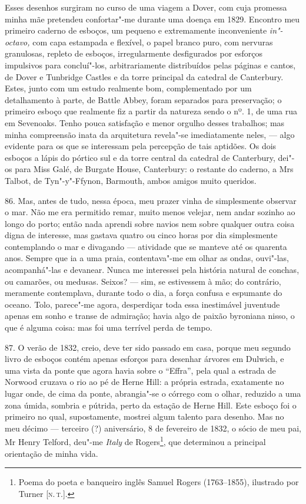 Esses desenhos surgiram no curso de uma viagem a Dover, com cuja
promessa minha mãe pretendeu confortar"-me durante uma doença em 1829.
Encontro meu primeiro caderno de esboços, um pequeno e extremamente
inconveniente \emph{in"-octavo,} com capa estampada e flexível, o papel
branco puro, com nervuras granulosas, repleto de esboços, irregularmente
desfigurados por esforços impulsivos para concluí"-los, arbitrariamente
distribuídos pelas páginas e cantos, de Dover e Tunbridge Castles e da
torre principal da catedral de Canterbury. Estes, junto com um estudo
realmente bom, complementado por um detalhamento à parte, de Battle
Abbey, foram separados para preservação; o primeiro esboço que realmente
fiz a partir da natureza sendo o nº. 1, de uma rua em Sevenoaks. Tenho
pouca satisfação e menor orgulho desses trabalhos; mas minha compreensão
inata da arquitetura revela"-se imediatamente neles, --- algo evidente
para os que se interessam pela percepção de tais aptidões. Os dois
esboços a lápis do pórtico sul e da torre central da catedral de
Canterbury, dei"-os para Miss Galé, de Burgate House, Canterbury: o
restante do caderno, a Mrs Talbot, de Tyn"-y"-Ffynon, Barmouth, ambos
amigos muito queridos.

86. Mas, antes de tudo, nessa época, meu prazer vinha de simplesmente
observar o mar. Não me era permitido remar, muito menos velejar, nem
andar sozinho ao longo do porto; então nada aprendi sobre navios nem
sobre qualquer outra coisa digna de interesse, mas gastava quatro ou
cinco horas por dia simplesmente contemplando o mar e divagando ---
atividade que se manteve até os quarenta anos. Sempre que ia a uma
praia, contentava"-me em olhar as ondas, ouvi"-las, acompanhá"-las e
devanear. Nunca me interessei pela história natural de conchas, ou
camarões, ou medusas. Seixos? --- sim, se estivessem à mão; do contrário,
meramente contemplava, durante todo o dia, a força confusa e espumante
do oceano. Tolo, parece"-me agora, desperdiçar toda essa inestimável
juventude apenas em sonho e transe de admiração; havia algo de paixão
byroniana nisso, o que é alguma coisa: mas foi uma terrível perda de
tempo.

87. O verão de 1832, creio, deve ter sido passado em casa, porque meu
segundo livro de esboços contém apenas esforços para desenhar árvores em
Dulwich, e uma vista da ponte que agora havia sobre o ``Effra'', pela
qual a estrada de Norwood cruzava o rio ao pé de Herne Hill: a própria
estrada, exatamente no lugar onde, de cima da ponte, abrangia"-se o
córrego com o olhar, reduzido a uma zona úmida, sombria e pútrida, perto
da estação de Herne Hill. Este esboço foi o primeiro no qual,
supostamente, mostrei algum talento para desenho. Mas no meu décimo ---
terceiro (?) aniversário, 8 de fevereiro de 1832, o sócio de meu pai, Mr
Henry Telford, deu"-me \emph{Italy} de Rogers\footnote{Poema do poeta e
  banqueiro inglês Samuel Rogers (1763--1855), ilustrado por Turner {[}\textsc{n.\,t.}{]}.}, que determinou a principal orientação de minha vida.

